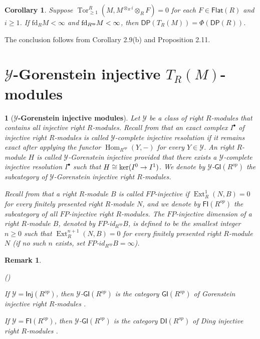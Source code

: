\documentclass[10pt,twoside]{amsart}
\theoremstyle{bfupright head,slanted body}
\theoremstyle{bfupright head,upright body}
\newtheorem{bfhpg}[res]{}               \newtheorem*{bfhpg*}{}
\theoremstyle{fixed bf head,slanted body}
\newtheorem{cor}[res]{Corollary}        \newtheorem*{cor*}{Corollary}
\theoremstyle{fixed bf head,upright body}
\newtheorem{rmk}[res]{Remark}           \newtheorem*{rmk*}{Remark}
\theoremstyle{numbered paragraph}
\newlength{\thmlistleft}        %
\newlength{\thmlistright}       %
\newlength{\thmlistpartopsep}   %
\newlength{\thmlisttopsep}      %
\newlength{\thmlistparsep}      %
\newlength{\thmlistitemsep}     %
\newcounter{prt}
\newenvironment{prt}{\begin{list}{\upshape (\alph{prt})}%
    {\usecounter{prt}%
      \setlength{\leftmargin}{\thmlistleft}%
      \setlength{\labelwidth}{\thmlistleft}%
      \setlength{\rightmargin}{\thmlistright}%
      \setlength{\partopsep}{\thmlistpartopsep}%
      \setlength{\topsep}{\thmlisttopsep}%
      \setlength{\parsep}{\thmlistparsep}%
      \setlength{\itemsep}{\thmlistitemsep}}}%
  {\end{list}}%
\newenvironment{prf*}[1][Proof]{%
  \begin{proof}[\bf #1]
    \setcounter{equation}{0}
    \renewcommand{\theequation}{\arabic{equation}}}
  {\end{proof}
  }
\numberwithin{equation}{res}
\newcommand{\DP}{\mathsf{DP}}
\newcommand{\DI}{\mathsf{DI}}
\newcommand{\GI}{\mathsf{GI}}
\newcommand{\fd}{\mathrm{fd}}
\newcommand{\Inj}{\mathsf{Inj}}
\newcommand{\Flat}{\mathsf{Flat}}
\newcommand{\FI}{\mathsf{FI}}
\newcommand{\Rop}{R^{\sf op}}
\newcommand{\kernel}{\mbox{\rm ker}}
\newcommand{\Hom}{\operatorname{Hom}}
\newcommand{\Ext}{\operatorname{Ext}}
\newcommand{\Tor}{\operatorname{Tor}}
\begin{document}
\begin{cor} \label{example of admissible and compatible}
Suppose $\Tor_{\geqslant 1}^R(M, M^{\otimes_Ri}\otimes_R F)=0$
for each $F\in \Flat(R)$ and $i \geqslant 1$.
If $\fd_RM<\infty$ and $\fd_{\Rop}M<\infty$,
then $\DP(T_R(M)) = \Phi(\DP(R))$.
\end{cor}

\begin{prf*}
The conclusion follows from Corollary 2.9(b) and Proposition 2.11.
\end{prf*}





\section{$\mathcal{Y}$-Gorenstein injective $T_R(M)$-modules}
\label{}%
\noindent


\begin{bfhpg}[\bf $\mathcal{Y}$-Gorenstein injective modules]
\label{}
Let $\mathcal{Y}$ be a class of right $R$-modules that contains all injective right $R$-modules.
Recall from \cite{GI} that
an exact complex $I^\bullet$ of injective right $R$-modules is called {\it $\mathcal{Y}$-complete injective resolution} if it remains exact after applying
the functor $\Hom_{R^{op}}(Y, -)$ for every $Y\in \mathcal{Y}$.
An right $R$-module $H$ is called \emph{$\mathcal{Y}$-Gorenstein injective}
provided that there exists a $\mathcal{Y}$-complete injective resolution $I^\bullet$
such that $H \cong \kernel(I^0 \to I^1)$. 
We denote by $\mathcal{Y}$-$\GI(R^{op})$ the subcategory of $\mathcal{Y}$-Gorenstein injective right $R$-modules.

Recall from \cite{S} that a right $R$-module $B$ is called $FP$-injective if $\Ext^{1}_{R}(N, B) = 0$ for every
finitely presented right $R$-module $N$, and
we denote by $\FI(R^{op})$ the subcategory of all $FP$-injective right $R$-modules. 
The $FP$-injective dimension of a right $R$-module $B$, denoted by $FP$-id$_{R^{op}}B$, is defined to be the smallest integer $n\geqslant 0$ such
that $\Ext^{n+1}_{R}(N, B) = 0$ for every finitely presented right $R$-module $N$ (if no such $n$
exists, set $FP$-$id_{R^{op}}B=\infty$).
\end{bfhpg}

\begin{rmk}
\begin{prt}
\item [(1)]If $\mathcal{Y}=\Inj(R^{op})$, then $\mathcal{Y}$-$\GI(R^{op})$ is the category $\GI(R^{op})$ of Gorenstein injective right $R$-modules \cite{GHD}.
\item[(2)] If $\mathcal{Y}=\FI(R^{op})$, then $\mathcal{Y}$-$\GI(R^{op})$ is the category $\DI(R^{op})$ of Ding injective right $R$-modules \cite{DLM, G}.
\end{prt}
\end{rmk}
\end{document}
